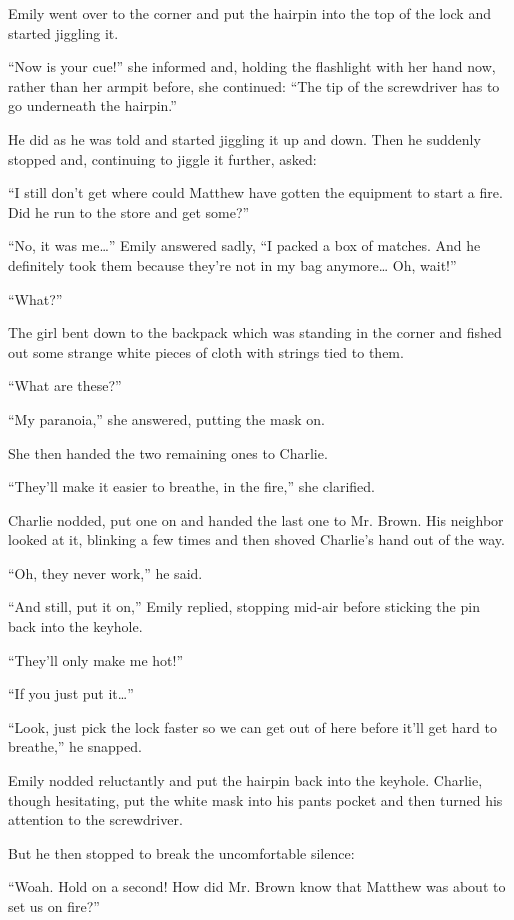 Emily went over to the corner and put the hairpin into the top of the lock and started jiggling it.

“Now is your cue!” she informed and, holding the flashlight with her hand now, rather than her armpit before, she continued: “The tip of the screwdriver has to go underneath the hairpin.”

He did as he was told and started jiggling it up and down. Then he suddenly stopped and, continuing to jiggle it further, asked:

“I still don’t get where could Matthew have gotten the equipment to start a fire. Did he run to the store and get some?”

“No, it was me…” Emily answered sadly, “I packed a box of matches. And he definitely took them because they’re not in my bag anymore… Oh, wait!”

“What?”

The girl bent down to the backpack which was standing in the corner and fished out some strange white pieces of cloth with strings tied to them.

“What are these?”

“My paranoia,” she answered, putting the mask on.

She then handed the two remaining ones to Charlie.

“They’ll make it easier to breathe, in the fire,” she clarified.

Charlie nodded, put one on and handed the last one to Mr. Brown. His neighbor looked at it, blinking a few times and then shoved Charlie’s hand out of the way.

“Oh, they never work,” he said.

“And still, put it on,” Emily replied, stopping mid-air before sticking the pin back into the keyhole.

“They’ll only make me hot!”

“If you just put it…”

“Look, just pick the lock faster so we can get out of here before it’ll get hard to breathe,” he snapped.

Emily nodded reluctantly and put the hairpin back into the keyhole. Charlie, though hesitating, put the white mask into his pants pocket and then turned his attention to the screwdriver.

But he then stopped to break the uncomfortable silence:

“Woah. Hold on a second! How did Mr. Brown know that Matthew was about to set us on fire?”

